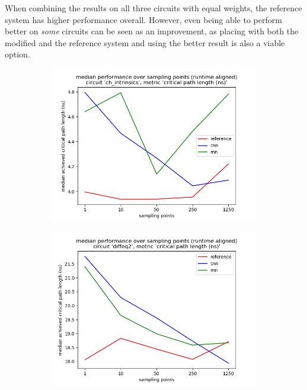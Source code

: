 When combining the results on all three circuits with equal weights, the reference system has higher performance overall. However, even being able to perform better on \textit{some} circuits can be seen as an improvement, as placing with both the modified and the reference system and using the better result is also a viable option.

\begin{figure}
	\centering
	\begin{subfigure}[b]{0.49\linewidth}
		\includegraphics[width=\linewidth]{plots/eval-ch_intrinsics-critical-path-median-full.png}
	\end{subfigure}
	\begin{subfigure}[b]{0.49\linewidth}
		\includegraphics[width=\linewidth]{plots/eval-diffeq2-critical-path-median-full.png}

\end{subfigure}
\end{figure}
